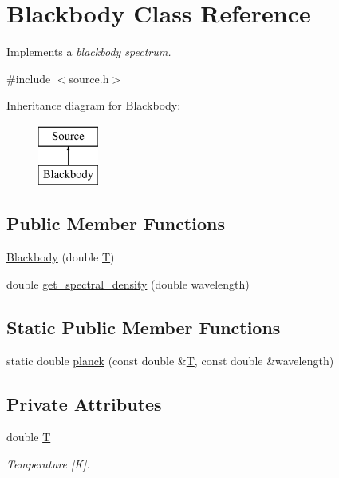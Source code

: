 \hypertarget{class_blackbody}{}\section{Blackbody Class Reference}
\label{class_blackbody}


Implements a {\itshape blackbody spectrum.}  




{\ttfamily \#include $<$source.\+h$>$}

Inheritance diagram for Blackbody\+:\begin{figure}[H]
\begin{center}
\leavevmode
\includegraphics[height=2.000000cm]{class_blackbody}
\end{center}
\end{figure}
\subsection*{Public Member Functions}
\begin{DoxyCompactItemize}
\item 
\hyperlink{class_blackbody_a4461b2a29dd0ee94ec0d23c7a936c4ce}{Blackbody} (double \hyperlink{class_blackbody_ab565e14b93a8459ebbd4e2c5583932f0}{T})
\item 
double \hyperlink{class_blackbody_a2e667cd4c4362550a77eb9081258ffb3}{get\+\_\+spectral\+\_\+density} (double wavelength)
\end{DoxyCompactItemize}
\subsection*{Static Public Member Functions}
\begin{DoxyCompactItemize}
\item 
static double \hyperlink{class_blackbody_a7c2d99ba62b8d499de07edaabdc3b7f9}{planck} (const double \&\hyperlink{class_blackbody_ab565e14b93a8459ebbd4e2c5583932f0}{T}, const double \&wavelength)
\end{DoxyCompactItemize}
\subsection*{Private Attributes}
\begin{DoxyCompactItemize}
\item 
double \hyperlink{class_blackbody_ab565e14b93a8459ebbd4e2c5583932f0}{T}
\begin{DoxyCompactList}\small\item\em Temperature \mbox{[}K\mbox{]}. \end{DoxyCompactList}\end{DoxyCompactItemize}


